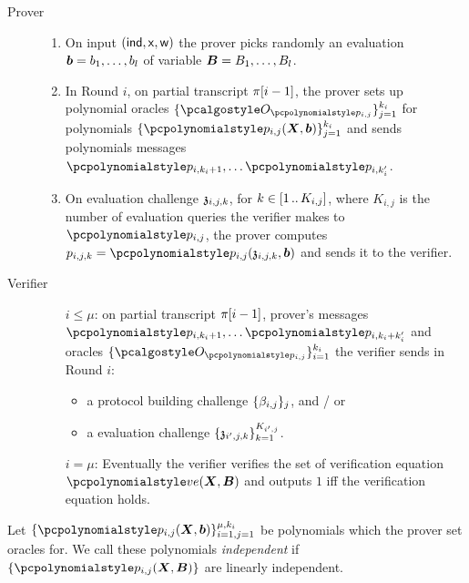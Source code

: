 \documentclass[runningheads,11pt]{llncs}
\let\spvec\vec
\let\vec\accentvec
\let\spvec\vec
\let\vec\spvec
\def\vec#1{\mathchoice{\mbox{\boldmath$\displaystyle#1$}}
  {\mbox{\boldmath$\textstyle#1$}} {\mbox{\boldmath$\scriptstyle#1$}}
  {\mbox{\boldmath$\scriptscriptstyle#1$}}}
\begin{document}
  \begin{description}
  \item[Prover]
    \begin{enumerate}
    \item On input $({\mathsf{ind}}, \mathsf{x}, \mathsf{w})$ the prover picks randomly an evaluation
      $\vec{b} = b_1, \ldots, b_l$ of variable $\vec{B} = B_1, \ldots, B_l$.
    \item In Round $i$, on partial transcript $\pi [i - 1]$, the prover sets up
      polynomial oracles $\smallset{\oracleo_{\p{p}_{i, j}}}_{j = 1}^{k_i}$ for polynomials
      $\smallset{\p{p_{i, j}} (\vec{X}, \vec{b})}_{j = 1}^{k_i}$ and sends
      polynomials messages $\p{p}_{i, k_i + 1}, \ldots \p{p}_{i, k'_i}$.
    \item On evaluation challenge $\mathfrak{z}_{i, j, k}$, for $k \in [1 \, .. \, K_{i, j}]$,
      where $K_{i, j}$ is the number of evaluation queries the verifier makes to
      $\p{p}_{i, j}$, the prover computes
      $p_{i, j, k} = \p{p}_{i, j} (\chz_{i, j, k}, \vec{b})$ and sends it to the
      verifier.
    \end{enumerate}
  \item[Verifier]
    \begin{enumerate}
    \item[$i \leq \mu$:] on partial transcript $\pi [i - 1]$, prover's messages
      $\p{p}_{i, k_i + 1}, \ldots \p{p}_{i, k_i + k'_i}$ and oracles
      $\smallset{\oracleo_{\p{p_{i, j}}}}_{i = 1}^{k_i}$ the verifier sends in Round
      $i$:
      \begin{itemize}
      \item a protocol building challenge $\{\beta_{i, j}\}_j$, and / or
      \item a evaluation challenge $\{\mathfrak{z}_{i', j, k}\}_{k = 1}^{K_{i', j}}$.
      \end{itemize}
    \item[$i = \mu$:] Eventually the verifier verifies the set of verification
      equation $\vereq (\vec{X}, \vec{B})$ and outputs $1$ iff the verification
      equation holds.
    \end{enumerate}
  \end{description}
  
\begin{definition}
  Let $\smallset{\p{p}_{i, j} (\vec{X}, \vec{b})}_{i = 1, j = 1}^{\mu, k_i}$ be polynomials
  which the prover set oracles for. We call these polynomials \emph{independent} if
  $\smallset{\p{p}_{i, j} (\vec{X}, \vec{B})}$ are linearly independent.
\end{definition}
\end{document}
